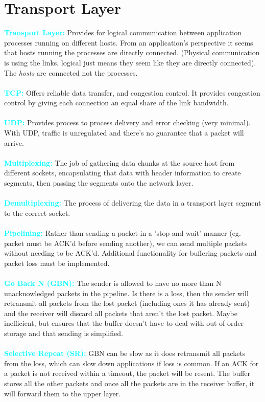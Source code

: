 \documentclass[]{article}
\begin{document}
\section{Transport Layer}
\textcolor{Cyan}{\textbf{Transport Layer:}} Provides for logical communication between application processes running on different hosts. From an application's perspective it seems that hosts running the processes are directly connected. (Physical communication is using the links, logical just means they seem like they are directly connected). The \emph{hosts} are connected not the processes.\\\\
\textcolor{Cyan}{\textbf{TCP:}} Offers reliable data transfer, and congestion control. It provides congestion control by giving each connection an equal share of the link bandwidth. \\\\
\textcolor{Cyan}{\textbf{UDP:}} Provides process to process delivery and error checking (very minimal). With UDP, traffic is unregulated and there's no guarantee that a packet will arrive. \\\\
\textcolor{Cyan}{\textbf{Multiplexing:}} The job of gathering data chunks at the source host from different sockets, encapsulating that data with header information to create segments, then passing the segments onto the network layer. \\\\
\textcolor{Cyan}{\textbf{Demultiplexing:}} The process of delivering the data in a transport layer segment to the correct socket. \\\\
\textcolor{Cyan}{\textbf{Pipelining:}} Rather than sending a packet in a 'stop and wait' manner (eg. packet must be ACK'd before sending another), we can send multiple packets without needing to be ACK'd. Additional functionality for buffering packets and packet loss must be implemented. \\\\
\textcolor{Cyan}{\textbf{Go Back N (GBN):}} The sender is allowed to have no more than N unacknowledged packets in the pipeline. Is there is a loss, then the sender will retransmit all packets from the lost packet (including ones it has already sent) and the receiver will discard all packets that aren't the lost packet. Maybe inefficient, but ensures that the buffer doesn't have to deal with out of order storage and that sending is simplified.\\\\
\textcolor{Cyan}{\textbf{Selective Repeat (SR):}} GBN can be slow as it does retransmit all packets from the loss, which can slow down applications if loss is common. If an ACK for a packet is not received within a timeout, the packet will be resent. The buffer stores all the other packets and once all the packets are in the receiver buffer, it will forward them to the upper layer. 
\end{document}
